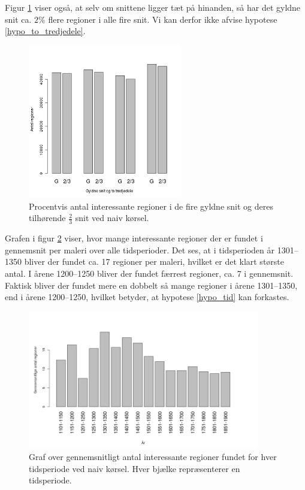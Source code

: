 {Figur \ref{G_vs_to_trejedele} viser også, at selv om snittene ligger tæt
på hinanden, så har det gyldne snit ca. $2 \%$ flere regioner i alle
fire snit. Vi kan derfor ikke afvise hypotese \ref{hypo_to_tredjedele}.

\begin{figure}[h!]
	\centering
	\includegraphics[width=0.6\textwidth]{afsnit/resultater/billeder/G_vs_to_tredjedele.png}
    \caption{Procentvis antal interessante regioner i de fire gyldne
    snit og deres tilhørende $\frac{2}{3}$ snit ved naiv kørsel.}
	\label{G_vs_to_trejedele}
\end{figure}

Grafen i figur \ref{naiv_year} viser, hvor mange interessante regioner
der er fundet i gennemsnit per maleri over alle tidsperioder. Det ses,
at i tidsperioden år 1301--1350 bliver der fundet ca. 17 regioner per
maleri, hvilket er det klart største antal. I årene 1200--1250 bliver
der fundet færrest regioner, ca. 7 i gennemsnit. Faktisk bliver der
fundet mere en dobbelt så mange regioner i årene 1301--1350, end i årene
1200--1250, hvilket betyder, at hypotese \ref{hypo_tid} kan forkastes.

\begin{figure}[!h]
	\centering
	\includegraphics[angle=0,width=0.90\textwidth]{afsnit/resultater/billeder/yearcut.png}
    \caption{Graf over gennemsnitligt antal interessante regioner fundet
    for hver tidsperiode ved naiv kørsel. Hver bjælke repræsenterer en
    tidsperiode.}
	\label{naiv_year}
\end{figure}

}
